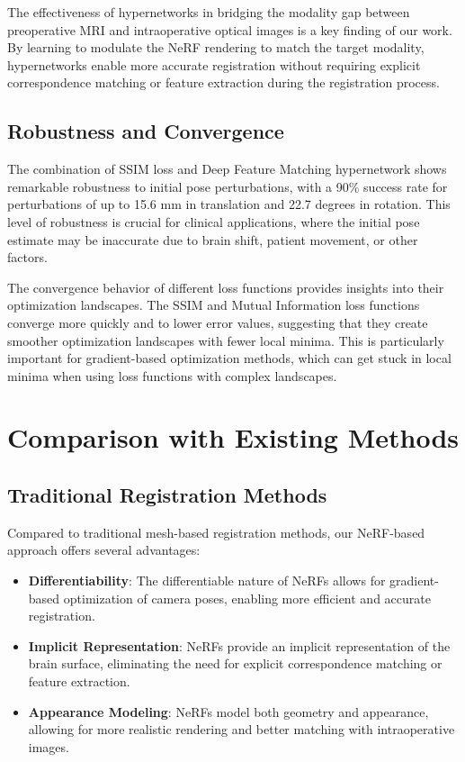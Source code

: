 The effectiveness of hypernetworks in bridging the modality gap between preoperative MRI and intraoperative optical images is a key finding of our work. By learning to modulate the NeRF rendering to match the target modality, hypernetworks enable more accurate registration without requiring explicit correspondence matching or feature extraction during the registration process.

\subsection{Robustness and Convergence}
The combination of SSIM loss and Deep Feature Matching hypernetwork shows remarkable robustness to initial pose perturbations, with a 90\% success rate for perturbations of up to 15.6 mm in translation and 22.7 degrees in rotation. This level of robustness is crucial for clinical applications, where the initial pose estimate may be inaccurate due to brain shift, patient movement, or other factors.

The convergence behavior of different loss functions provides insights into their optimization landscapes. The SSIM and Mutual Information loss functions converge more quickly and to lower error values, suggesting that they create smoother optimization landscapes with fewer local minima. This is particularly important for gradient-based optimization methods, which can get stuck in local minima when using loss functions with complex landscapes.

\section{Comparison with Existing Methods}

\subsection{Traditional Registration Methods}
Compared to traditional mesh-based registration methods, our NeRF-based approach offers several advantages:

\begin{itemize}
    \item \textbf{Differentiability}: The differentiable nature of NeRFs allows for gradient-based optimization of camera poses, enabling more efficient and accurate registration.
    
    \item \textbf{Implicit Representation}: NeRFs provide an implicit representation of the brain surface, eliminating the need for explicit correspondence matching or feature extraction.
    
    \item \textbf{Appearance Modeling}: NeRFs model both geometry and appearance, allowing for more realistic rendering and better matching with intraoperative images.
\end{itemize}

